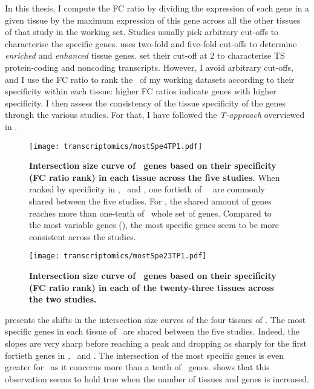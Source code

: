 In this thesis,
I compute the FC ratio by dividing the expression
of each gene in a given tissue
by the maximum expression of this gene across all the other tissues of that study
in the working set.
Studies usually pick arbitrary cut-offs to characterise the specific genes.
\citet{Uhlen2015} uses two-fold and five-fold cut-offs
to determine \emph{enriched} and \emph{enhanced} tissue genes.
\citet{Zhu2016-xo} set their cut-off at $2$ to characterise \gls{TS} protein-coding
and noncoding transcripts.
However,
I avoid arbitrary cut-offs, and
I use the FC ratio to rank the \pcgs\ of my working datasets according
to their specificity within each tissue:
higher FC ratios indicate genes with higher specificity.
I then assess the consistency of the tissue specificity of the genes through the
various studies.
For that, I have followed the \emph{T-approach} overviewed in .

\begin{figure}[!pthb]
    \texttt{[image: transcriptomics/mostSpe4TP1.pdf]}\centering
    \vspace{-0.2in}
    \caption[Intersection size curve of \setOne\ genes based on their FC ratio
    rank in each tissue across the five studies]{\label{fig:mostSpe4T}\textbf{Intersection
    size curve of \setOne\ genes based on their specificity (FC ratio rank)
    in each tissue across the five studies.}
    When ranked by specificity in \heart, \kidney\ and \liver,
    one fortieth of \setOne\ \pcgs\ are commonly shared between the five studies.
    For \testis, the shared amount of genes reaches more than one-tenth of \setOne\
    whole set of genes.
    Compared to the most variable genes (),
    the most specific genes seem to be more consistent across the studies.
    }
\end{figure}
\begin{figure}[!pbht]
    \texttt{[image: transcriptomics/mostSpe23TP1.pdf]}\centering
    \vspace{-0.2in}
    \caption[Intersection size curve of \setTwo\ genes based on their FC ratio
    rank in each tissue across the two studies]{\label{fig:mostSpe23T}\textbf{Intersection
    size curve of \setTwo\ genes based on their specificity (FC ratio rank)
    in each of the twenty-three tissues across the two studies.}
    }
\end{figure}

 presents the shifts in the intersection size curves of the
four tissues of \setOne.
The most specific genes in each tissue of \setOne\ are shared between the
five studies.
Indeed, the slopes are very sharp before reaching a peak and dropping as sharply
for the first fortieth genes in \heart, \kidney\ and \liver.
The intersection of the most specific genes is even greater for \testis\ as
it concerns more than a tenth of \setOne\ genes.
 shows that this observation seems to hold true
when the number of tissues and genes is increased.

